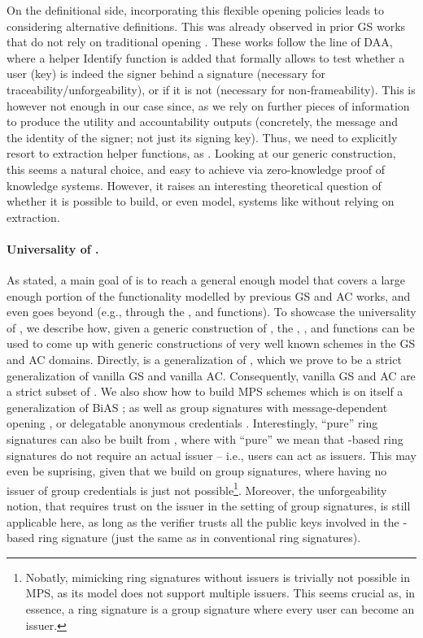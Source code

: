 On the definitional side, incorporating this flexible opening policies leads to
considering alternative definitions. This was already observed in prior GS works
that do not rely on traditional opening \cite{gl19,dl21,fgl21}. These works
follow the line of DAA, where a helper Identify function is added that formally
allows to test whether a user (key) is indeed the signer behind a signature
(necessary for traceability/unforgeability), or if it is not (necessary for
non-frameability). This is however not enough in our case since, as we rely on
further pieces of information to produce the utility and accountability outputs
(concretely, the message and the identity of the signer; not just its signing
key). Thus, we need to explicitly resort to extraction helper functions, as
\cite{lnpy21}. Looking at our generic construction, this seems a natural choice,
and easy to achieve via zero-knowledge proof of knowledge systems. However, it
raises an interesting theoretical question of whether it is possible to
build, or even model, systems like \UAS without relying on extraction.

\paragraph{Universality of \UAS.} %
As stated, a main goal of \UAS is to reach a general enough model that covers a
large enough portion of the functionality modelled by previous GS and AC works,
and even goes beyond (e.g., through the \fissue, \feval and \finsp functions).
To showcase the universality of \UAS, we describe how, given a generic
construction of \UAS, the \fissue, \feval, and \finsp functions can be used to
come up with generic constructions of very well known schemes in the GS and AC
domains. Directly, \UAS is a generalization of \GSAC, which we prove to be a
strict generalization of vanilla GS and vanilla AC. Consequently, vanilla GS and
AC are a strict subset of \UAS. We also show how to build MPS schemes \needcite
which is on itself a generalization of BiAS \cite{lnpy21}; as well as group
signatures with message-dependent opening \cite{ehk+19}, or delegatable
anonymous credentials \cite{bcc+09,cklm14}.
%
Interestingly, ``pure'' ring signatures \cite{rst06} can also be built from
\UAS, where with ``pure'' we mean that \UAS-based ring signatures do not require
an actual issuer -- i.e., users can act as issuers. This may even be suprising,
given that we build on
group signatures, where having no issuer of group credentials is just not
possible\footnote{Nobatly, mimicking ring signatures without issuers is
  trivially not possible in MPS, as its model does not support multiple
  issuers. This seems crucial as, in essence, a ring signature is a group
  signature where every user can become an issuer.}. Moreover, the
unforgeability notion, that requires trust on the issuer in the setting of group
signatures, is still applicable here, as long as the verifier trusts all
the public keys involved in the \UAS-based ring signature (just the same
as in conventional ring signatures). 

